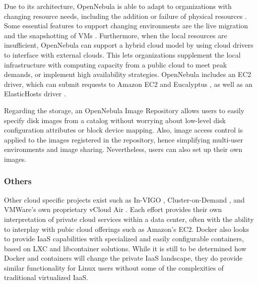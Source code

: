 Due to its architecture, OpenNebula is able to adapt to organizations with changing resource needs, including the addition or failure of physical resources \cite{sotomayorvirtual}. Some essential features to support changing environments are the live migration and the snapshotting of VMs \cite{www/opennebula}. Furthermore, when the local resources are insufficient, OpenNebula can support a hybrid cloud model by using cloud drivers to inter­face with external clouds. This lets organizations supplement the local infrastructure with computing capacity from a public cloud to meet peak demands, or implement high availability strategies. OpenNebula includes an EC2 driver, which can submit requests to Amazon EC2 and Eucalyptus \cite{nurmi2008eos}, as well as an ElasticHosts driver \cite{www/elastichosts}.

Regarding the storage, an OpenNebula Image Repository allows users to easily specify disk images from a catalog without worrying about low-level disk configuration attributes or block device mapping. Also, image access control is applied to the images registered in the repository, hence simplifying multi-user environments and image sharing. Nevertheless, users can also set up their own images. 


\subsubsection{Others}

Other cloud specific projects exist such as In-VIGO \cite{adabala2005virtualized}, Cluster-on-Demand \cite{chase2003dvc}, and VMWare's own proprietary vCloud Air \cite{www-vmware-vcloud}.  Each effort provides their own interpretation of private cloud services within a data center, often with the ability to interplay with pubic cloud offerings such as Amazon's EC2. Docker \cite{merkel2014docker} also looks to provide IaaS capabilities with specialized and easily configurable containers, based on LXC and libcontainer solutions. While it is still to be determined how Docker and containers will change the private IaaS landscape, they do provide similar functionality for Linux users without some of the complexities of traditional virtualized IaaS.  



 






